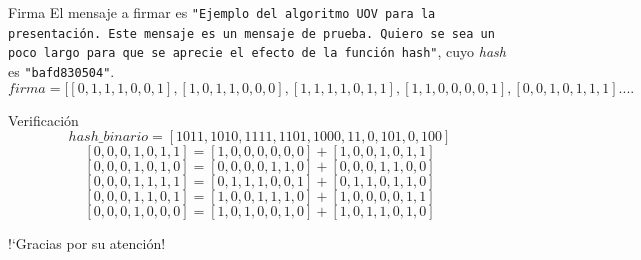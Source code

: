 \documentclass[10pt,aspectratio=169,]{beamer}
\begin{document}
\begin{frame}[c]{Firma}
	\large
	El mensaje a firmar es \texttt{"{}Ejemplo del algoritmo UOV para la presentación. Este mensaje es un mensaje de prueba. Quiero se sea un poco largo para que se aprecie el efecto de la función hash"{}}, cuyo \textit{hash} es \texttt{"{}bafd830504"{}}.
	\normalsize
	$$firma = [[0, 1, 1, 1, 0, 0, 1], [1, 0, 1, 1, 0, 0, 0], [1, 1, 1, 1, 0, 1, 1], [1, 1, 0, 0, 0, 0, 1], [0, 0, 1, 0, 1, 1, 1]....$$
	
\end{frame}

\begin{frame}[c]{Verificación}
	$$hash\_binario = [1011, 1010, 1111, 1101, 1000, 11, 0, 101, 0, 100]$$
	\vspace{0.05cm}
	$$[0, 0, 0, 1, 0, 1, 1] = [1, 0, 0, 0, 0, 0, 0] + [1, 0, 0, 1, 0, 1, 1]$$
	$$[0, 0, 0, 1, 0, 1, 0] = [0, 0, 0, 0, 1, 1, 0] + [0, 0, 0, 1, 1, 0, 0]$$
	$$[0, 0, 0, 1, 1, 1, 1] = [0, 1, 1, 1, 0, 0, 1] + [0, 1, 1, 0, 1, 1, 0]$$
	$$[0, 0, 0, 1, 1, 0, 1] = [1, 0, 0, 1, 1, 1, 0] + [1, 0, 0, 0, 0, 1, 1]$$
	$$[0, 0, 0, 1, 0, 0, 0] = [1, 0, 1, 0, 0, 1, 0] + [1, 0, 1, 1, 0, 1, 0]$$
\end{frame}

\begin{frame}[plain]
	\vfill
	\centering
	{
		\centering \Huge \color{white} !`Gracias por su atención!\\[10pt]
	}
	\vfill
\end{frame}
\end{document}
